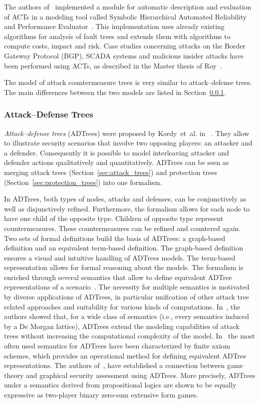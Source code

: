\documentclass[a4paper]{article}
\begin{document}
The authors of~\cite{RoKiTr2} implemented a module for automatic description and
evaluation of ACTs in a modeling tool called Symbolic Hierarchical Automated
Reliability and Performance Evaluator~\cite{sharpe}. This implementation uses
already existing algorithms for analysis of fault trees and extends them with
algorithms to compute costs, impact and risk. Case studies concerning attacks on
the Border Gateway Protocol (BGP), SCADA systems and malicious insider attacks
have been performed using ACTs, as described in the Master thesis of
Roy~\cite{Roy}.

The model of attack countermeasure trees is very similar to 
attack--defense trees. The main differences between the two models 
are listed in Section~\ref{sec:attack_defense_trees}.

\subsubsection{Attack--Defense Trees} 
\label{sec:attack_defense_trees}

\emph{Attack--defense trees} (ADTrees) were proposed by Kordy~et~al. in
~\cite{KoMaRaSc}. They allow to illustrate security scenarios that involve
two opposing players: an attacker and a defender. Consequently it is  possible 
to model interleaving attacker and defender actions qualitatively and 
quantitatively. ADTrees can be seen as merging attack trees
(Section~\ref{sec:attack_trees}) and protection trees
(Section~\ref{sec:protection_trees}) into one formalism.

In ADTrees, both types of nodes, attacks and defenses, can be conjunctively as
well as disjunctively refined. Furthermore, the formalism allows for each node
to have one child of the opposite type. Children of opposite type represent
countermeasures. These countermeasures can be refined and countered again.  Two
sets of formal definitions build the basis of ADTrees: a graph-based definition
and an equivalent term-based definition. The graph-based definition ensures a
visual and intuitive handling of ADTrees models. The term-based representation
allows for formal reasoning about the models.  The formalism is enriched through
several semantics that allow to define  equivalent ADTree representations of a
scenario~\cite{KoMaRaSc2}. The necessity for multiple semantics is motivated by
diverse applications of ADTrees, in particular unification of other attack tree
related approaches and suitability for various kinds of computations.
In~\cite{KoPoSc}, the authors showed that, for a wide class of semantics (i.e.,
every semantics induced by a De Morgan lattice), ADTrees extend the modeling
capabilities of attack trees without increasing the computational complexity of
the model.  In~\cite{KoMaRaSc2} the most often used semantics for ADTrees have
been  characterized by finite axiom schemes, which provides an operational
method for  defining equivalent ADTree representations.  The authors
of~\cite{KoMaMeSc}, have established a connection between game theory and
graphical security assessment using ADTrees. More precisely, ADTrees under a
semantics derived from  propositional logics are shown to be  equally expressive
as two-player binary zero-sum extensive form games.
\end{document}
